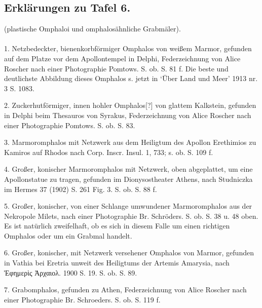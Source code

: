 \documentclass[a4paper, 11pt, oneside]{article}
\begin{document}
\subsection{Erklärungen zu Tafel 6.}
\begin{center}
(plastische Omphaloi und omphalosähnliche Grabmäler).
\end{center}
\paragraph{}
1. Netzbedeckter, bienenkorbförmiger Omphalos von weißem Marmor, gefunden auf dem Platze vor dem Apollontempel in Delphi, Federzeichnung von Alice Roscher nach einer Photographie Pomtows. S. ob. S. 81 f. Die beste und deutlichste Abbildung dieses Omphalos s. jetzt in `Über Land und Meer' 1913 nr. 3 S. 1083.

2. Zuckerhutförmiger, innen hohler Omphalos[?] von glattem Kalkstein, gefunden in Delphi beim Thesauros von Syrakus, Federzeichnung von Alice Roscher nach einer Photographie Pomtows. S. ob. S. 83.

3. Marmoromphalos mit Netzwerk aus dem Heiligtum des Apollon Erethimios zu Kamiros auf Rhodos nach Corp. Inscr. Insul. 1, 733; s. ob. S. 109 f.

4. Großer, konischer Marmoromphalos mit Netzwerk, oben abgeplattet, um eine Apollonstatue zu tragen, gefunden im Dionysostheater Athens, nach Studniczka im Hermes 37 (1902) S. 261 Fig. 3. S. ob. S. 88 f.

5. Großer, konischer, von einer Schlange umwundener Marmoromphalos aus der Nekropole Milets, nach einer Photographie Br. Schröders. S. ob. S. 38 u. 48 oben. Es ist natürlich zweifelhaft, ob es sich in diesem Falle um einen richtigen Omphalos oder um ein Grabmal handelt.

6. Großer, konischer, mit Netzwerk versehener Omphalos von Marmor, gefunden in Vathia bei Eretria unweit des Heiligtums der Artemis Amarysia, nach Ἐφημερὶς Ἀρχαιολ. 1900 S. 19. S. ob. S. 89.

7. Grabomphalos, gefunden zu Athen, Federzeichnung von Alice Roscher nach einer Photographie Br. Schroeders. S. ob. S. 119 f.
\end{document}
